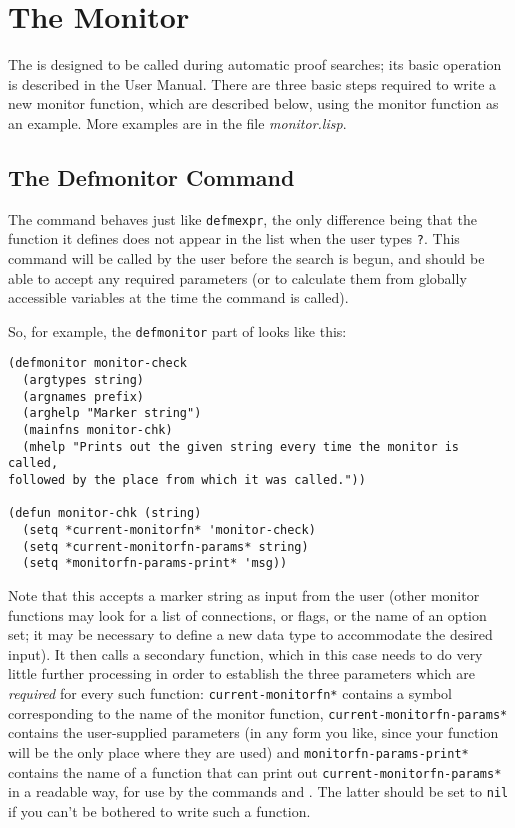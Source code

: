 \chapter{The Monitor}
\label{monitor}

The  is designed to be called during automatic proof searches; its basic
operation is described in the User Manual. There are three basic steps required to 
write a new monitor function, which are described below, using the monitor function 
 as an example. More examples are in the file {\it monitor.lisp}.

\section{The Defmonitor Command}

The command  behaves just like {\tt defmexpr}, the only difference being
that the function it defines does not appear in the list when the user types {\tt ?}. This command
will be called by the user before the search is begun, and should be able to accept any required 
parameters (or to calculate them from globally accessible variables at the time the command is
called).

So, for example, the {\tt defmonitor} part of  looks like this:

\begin{verbatim}
(defmonitor monitor-check
  (argtypes string)
  (argnames prefix)
  (arghelp "Marker string")
  (mainfns monitor-chk)
  (mhelp "Prints out the given string every time the monitor is called, 
followed by the place from which it was called."))

(defun monitor-chk (string)
  (setq *current-monitorfn* 'monitor-check)
  (setq *current-monitorfn-params* string)
  (setq *monitorfn-params-print* 'msg))
\end{verbatim}

Note that this accepts a marker string as input from the user (other monitor functions may 
look for a list of connections, or flags, or the name of an option set; it may be necessary 
to define a new data type to accommodate the desired input). It then calls a secondary 
function, which in this case needs to do very little further processing in order to 
establish the three parameters which are {\it required} for every such function: {\tt *current-monitorfn*}
contains a symbol corresponding to the name of the monitor function, {\tt *current-monitorfn-params*} 
contains the user-supplied parameters (in any form you like, since your function will be the only 
place where they are used) and {\tt *monitorfn-params-print*} contains the name of a function that can 
print out {\tt *current-monitorfn-params*} in a readable way, for use by the commands 
and . The latter should be set to {\tt nil} if you can't be bothered to write such 
a function.

